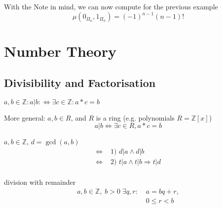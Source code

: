 With the Note in mind, we can now compute for the previous example
\[
    \mu( 0_{\Pi_n}, 1_{\Pi_n}) = (-1)^{n-1} (n-1)!
\]


\chapter{Number Theory}



\section{Divisibility and Factorisation}

\begin{definition}
$a,b \in \mathbb{Z}: a|b: \Leftrightarrow \exists c \in \mathbb{Z}: a * c = b$

More general: 
$a,b \in R$, and $R$ is a ring (e.g. polynomials $R = \mathbb{Z}[x]$)
\[
  a|b \Leftrightarrow \exists c \in R , a * c = b
\]
\end{definition}

\begin{definition}
$a,b \in \mathbb{Z}$, $d = \gcd(a,b)$
\begin{align*}
    \Leftrightarrow & \text{ 1) } d|a \wedge d|b \\
    \Leftrightarrow & \text{ 2) } t|a \wedge t|b \Rightarrow t|d \\
\end{align*}
\end{definition}

\begin{definition}
division with remainder
\begin{align*}
  a,b \in \mathbb{Z}, \; 
  b > 0 \;\exists q,r: 
    & \; a = b q  + r, \\ 
    & \; 0 \leq r < b
\end{align*}
\end{definition}



